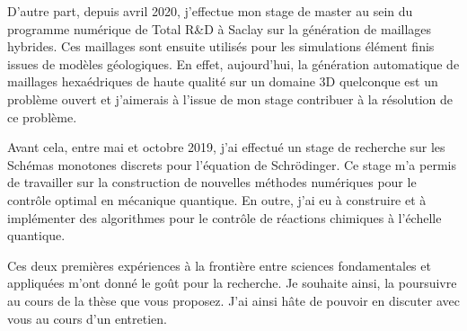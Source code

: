 \documentclass[11pt,a4paper,sans]{moderncv}        %
\begin{document}
D'autre part, depuis avril 2020, j'effectue mon stage de master au sein du programme numérique de Total R\&D à Saclay sur la génération de maillages hybrides. Ces maillages sont ensuite utilisés pour les simulations élément finis issues de modèles géologiques. En effet, aujourd'hui, la génération automatique de maillages hexaédriques de haute qualité sur un domaine 3D quelconque est un problème ouvert et j'aimerais à l'issue de mon stage contribuer à la résolution de ce problème.

Avant cela, entre mai et octobre 2019, j’ai effectué un stage de recherche sur les Schémas monotones discrets pour l'équation de Schrödinger. Ce stage m'a permis de travailler sur la construction de nouvelles méthodes numériques pour le contrôle optimal en mécanique quantique. En outre, j’ai eu à construire et à implémenter des algorithmes pour le contrôle de réactions chimiques à l'échelle quantique.



Ces deux premières expériences à la frontière entre sciences fondamentales et appliquées m’ont donné le goût pour la recherche. Je souhaite ainsi, la poursuivre au cours de la thèse que vous proposez. J’ai ainsi hâte de pouvoir en discuter avec vous au cours d'un entretien.




\makeletterclosing
\end{document}
